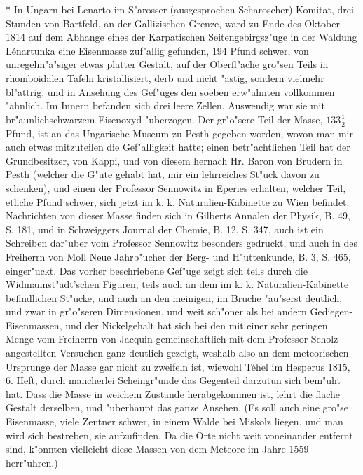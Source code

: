 \documentclass[a4paper, 11pt, oneside, polutonikogreek, german]{article}
\begin{document}
* In Ungarn bei Lenarto im S"arosser (ausgesprochen Scharoscher) Komitat, drei Stunden von Bartfeld, an der Gallizischen Grenze, ward zu Ende des Oktober 1814 auf dem Abhange eines der Karpatischen Seitengebirgsz"uge in der Waldung Lénartunka eine Eisenmasse zuf"allig gefunden, 194 Pfund schwer, von unregelm"a"siger etwas platter Gestalt, auf der Oberfl"ache gro"sen Teils in rhomboidalen Tafeln kristallisiert, derb und nicht "astig, sondern vielmehr bl"attrig, und in Ansehung des Gef"uges den soeben erw"ahnten vollkommen "ahnlich. Im Innern befanden sich drei leere Zellen. Auswendig war sie mit br"aunlichschwarzem Eisenoxyd "uberzogen. Der gr"o"sere Teil der Masse, $\mathfrak{133\frac{1}{2}}$ Pfund, ist an das Ungarische Museum zu Pesth gegeben worden, wovon man mir auch etwas mitzuteilen die Gef"alligkeit hatte; einen betr"achtlichen Teil hat der Grundbesitzer, von Kappi, und von diesem hernach Hr. Baron von Brudern in Pesth (welcher die G"ute gehabt hat, mir ein lehrreiches St"uck davon zu schenken), und einen der Professor Sennowitz in Eperies erhalten, welcher Teil, etliche Pfund schwer, sich jetzt im k. k. Naturalien-Kabinette zu Wien befindet. Nachrichten von dieser Masse finden sich in Gilberts Annalen der Physik, B. 49, S. 181, und in Schweiggers Journal der Chemie, B. 12, S. 347, auch ist ein Schreiben dar"uber vom Professor Sennowitz besonders gedruckt, und auch in des Freiherrn von Moll Neue Jahrb"ucher der Berg- und H"uttenkunde, B. 3, S. 465, einger"uckt. Das vorher beschriebene Gef"uge zeigt sich teils durch die Widmannst"adt'schen Figuren, teils auch an dem im k. k. Naturalien-Kabinette befindlichen St"ucke, und auch an den meinigen, im Bruche "au"serst deutlich, und zwar in gr"o"seren Dimensionen, und weit sch"oner als bei andern Gediegen-Eisenmassen, und der Nickelgehalt hat sich bei den mit einer sehr geringen Menge vom Freiherrn von Jacquin gemeinschaftlich mit dem Professor Scholz angestellten Versuchen ganz deutlich gezeigt, weshalb also an dem meteorischen Ursprunge der Masse gar nicht zu zweifeln ist, wiewohl Téhel im Hesperus 1815, 6. Heft, durch mancherlei Scheingr"unde das Gegenteil darzutun sich bem"uht hat. Dass die Masse in weichem Zustande herabgekommen ist, lehrt die flache Gestalt derselben, und "uberhaupt das ganze Ansehen. (Es soll auch eine gro"se Eisenmasse, viele Zentner schwer, in einem Walde bei Miskolz liegen, und man wird sich bestreben, sie aufzufinden. Da die Orte nicht weit voneinander entfernt sind, k"onnten vielleicht diese Massen von dem Meteore im Jahre 1559 herr"uhren.)
\end{document}
